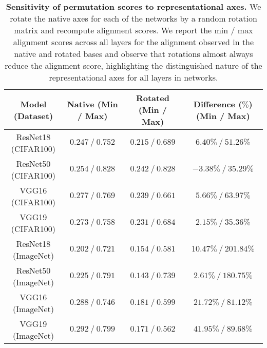 \begin{table*}[!b]
    \centering
    \begin{tabular}{cccc}
    \toprule
    Model (Dataset) & Native (Min / Max) & Rotated (Min / Max) & Difference ($\%$) (Min / Max)\\
    \midrule
        ResNet18 (CIFAR100) & $0.247 \ / \ 0.752$ & $0.215 \ / \ 0.689$ & $6.40\% \ / \ 51.26\%$ \\
        ResNet50 (CIFAR100) & $0.254 \ / \ 0.828$ & $0.242 \ / \ 0.828$ & $-3.38\% \ / \ 35.29\%$ \\
        VGG16 (CIFAR100) & $0.277 \ / \ 0.769$ & $0.239 \ / \ 0.661$ & $5.66\% \ / \ 63.97\%$ \\
        VGG19 (CIFAR100) & $0.273 \ / \ 0.758$ & $0.231 \ / \ 0.684$ & $2.15\% \ / \ 35.36\%$ \\
        ResNet18 (ImageNet) & $0.202 \ / \ 0.721$ & $0.154 \ / \ 0.581$ & $10.47\% \ / \ 201.84\%$ \\
        ResNet50 (ImageNet) & $0.225 \ / \ 0.791$ & $0.143 \ / \ 0.739$ & $2.61\% \ / \ 180.75\%$ \\
        VGG16 (ImageNet) & $0.288 \ / \ 0.746$ & $0.181 \ / \ 0.599$ & $21.72\% \ / \ 81.12\%$ \\
        VGG19 (ImageNet) & $0.292 \ / \ 0.799$ & $0.171 \ / \ 0.562$ & $41.95\% \ / \ 89.68\%$ \\
    \bottomrule
    \end{tabular}
    \caption{\textbf{Sensitivity of permutation scores to representational axes.} We rotate the native axes for each of the networks by a random rotation matrix and recompute alignment scores. We report the min / max alignment scores across all layers for the alignment observed in the native and rotated bases and observe that rotations almost always reduce the alignment score, highlighting the distinguished nature of the representational axes for all layers in networks.}
    \label{tab:perm-rotated}
\end{table*}
